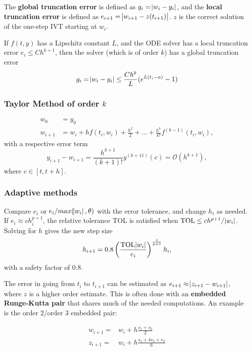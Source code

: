 \begin{definition}
The \textbf{global truncation error} is defined as $g_i = \abs{w_i-y_i}$, and the \textbf{local truncation error} is defined as $e_{i+1} = \abs{w_{i+1} - z(t_{i+1})}$. $z$ is the correct solution of the one-step IVT starting at $w_i$.
\end{definition}

\begin{theorem}
If $f(t,y)$ has a Lipschitz constant $L$, and the ODE solver has a local truncation error $e_i \leq C h^{k+1}$, then the solver (which is of order $k$) has a global truncation error
$$
g_i = \abs{w_i - y_i} \leq \frac{Ch^k}{L}(e^{L(t_i - a)} - 1)
$$
\end{theorem}

\subsubsection{Taylor Method of order $k$}
\begin{align*}
    w_0 & = y_0 \\
    w_{i+1} & = w_i + h f(t_i, w_i) + \frac{h^2}{2} + ... + \frac{h^k}{k!}f^{(k-1)}(t_i, w_i),
\end{align*}
with a respective error term 
$$
y_{i+1} - w_{i+1}  =  \frac{h^{k+1}}{(k+1)!}y^{(k+11)}(c) = \mathcal{O}(h^{k+1}),
$$
where $c \in [t, t+h]$.

\subsubsection{Adaptive methods}
Compare $e_i$ or $e_i/max(\abs{w_i}, \theta)$ with the error tolerance, and change $h_i$ as needed. If $e_i \approx ch_i^{p+1}$, the relative tolerance TOL is satisfied when $\text{TOL} \leq ch^{p+1} / \abs{w_i}$. Solving for $h$ gives the new step size
$$
h_{i+1} = 0.8\left(\frac{\text{TOL}\abs{w_i}}{e_i}\right)^{\frac{1}{p+1}} h_i,
$$
with a safety factor of $0.8$.

The error in going from $t_i$ to $t_{i+1}$ can be estimated as $e_{i+1} \approx \abs{z_{i+1} - w_{i+1}}$, where $z$ is a higher order estimate. This is often done with an \textbf{embedded Runge-Kutta pair} that shares much of the needed computations. An example is the order 2/order 3 embedded pair:

\begin{align*}
w_{i+1} = & w_i + h \frac{s_1 +s_2}{2} \\
z_{i+1} = & w_i + h \frac{s_1 + 4s_3 + s_2}{6}
\end{align*}

